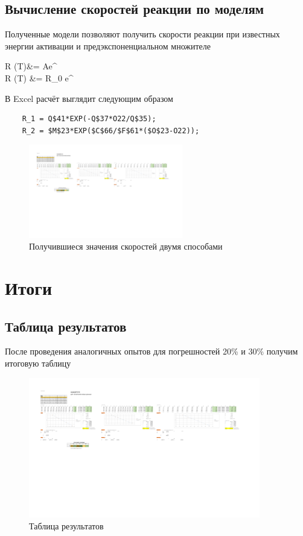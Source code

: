 \documentclass[14pt,a4paper]{extarticle}
\begin{document}
\subsection{Вычисление скоростей реакции по моделям}
Полученные модели позволяют получить скорости реакции при известных энергии активации и предэкспоненциальном множителе
\begin{aleq}
	R (T)&= Ae^{\EE{}}\\
	R (T) &= R_0 e^{} 
\end{aleq}
В Excel расчёт выглядит следующим образом
\begin{lstlisting}
	R_1 = Q$41*EXP(-Q$37*O22/Q$35);
	R_2 = $M$23*EXP($C$66/$F$61*($O$23-O22));
\end{lstlisting}
\begin{figure}[H]
	\centering
	\includegraphics[trim=194 460 733 120, clip, width=0.6\textwidth]{results.pdf}\caption{Получившиеся значения скоростей двумя способами}\label{fig:res10}
\end{figure}
\section{Итоги}
\subsection{Таблица результатов}
После проведения аналогичных опытов для погрешностей 20\% и 30\% получим итоговую таблицу
\begin{figure}[H]
	\centering
	\includegraphics[trim=160 300 740 280, clip, width=0.9\textwidth]{results.pdf}\caption{Таблица результатов}\label{fig:tabl}
\end{figure}
\end{document}
